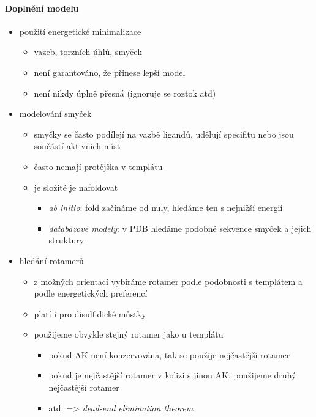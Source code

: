 \documentclass[DIV=8]{scrreprt}
\begin{document}
\paragraph{Doplnění modelu}
\begin{itemize}[nosep]
    \item použití energetické minimalizace
\begin{itemize}[nosep]
    \item vazeb, torzních úhlů, smyček
    \item není garantováno, že přinese lepší model
    \item není nikdy úplně přesná (ignoruje se roztok atd)
\end{itemize}

    \item modelování smyček
\begin{itemize}[nosep]
    \item smyčky se často podílejí na vazbě ligandů, udělují specifitu nebo jsou součástí aktivních míst
    \item často nemají protějška v templátu
    \item je složité je nafoldovat
\begin{itemize}[nosep]
    \item \emph{ab initio}: fold začínáme od nuly, hledáme ten s nejnižší energií
    \item \emph{databázové modely}: v PDB hledáme podobné sekvence smyček a jejich struktury
\end{itemize}

\end{itemize}

    \item hledání rotamerů
\begin{itemize}[nosep]
    \item z možných orientací vybíráme rotamer podle podobnosti s templátem a podle energetických preferencí
    \item platí i pro disulfidické můstky
    \item použijeme obvykle stejný rotamer jako u templátu
\begin{itemize}[nosep]
    \item pokud AK není konzervována, tak se použije nejčastější rotamer
    \item pokud je nejčastější rotamer v kolizi s jinou AK, použijeme druhý nejčastější rotamer
    \item atd. => \emph{dead-end elimination theorem}
\end{itemize}

\end{itemize}

\end{itemize}
\end{document}
